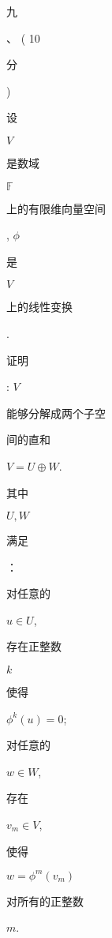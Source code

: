 \documentclass[10pt]{article}
\begin{document}
\begin{CJK}{UTF8}{mj}九\end{CJK}、 ( 10 \begin{CJK}{UTF8}{mj}分\end{CJK}) \begin{CJK}{UTF8}{mj}设\end{CJK} $V$ \begin{CJK}{UTF8}{mj}是数域\end{CJK} $\mathbb{F}$ \begin{CJK}{UTF8}{mj}上的有限维向量空间\end{CJK}, $\phi$ \begin{CJK}{UTF8}{mj}是\end{CJK} $V$ \begin{CJK}{UTF8}{mj}上的线性变换\end{CJK}. \begin{CJK}{UTF8}{mj}证明\end{CJK}: $V$ \begin{CJK}{UTF8}{mj}能够分解成两个子空\end{CJK} \begin{CJK}{UTF8}{mj}间的直和\end{CJK} $V=U \oplus W$. \begin{CJK}{UTF8}{mj}其中\end{CJK} $U, W$ \begin{CJK}{UTF8}{mj}满足\end{CJK}：\begin{CJK}{UTF8}{mj}对任意的\end{CJK} $u \in U$, \begin{CJK}{UTF8}{mj}存在正整数\end{CJK} $k$ \begin{CJK}{UTF8}{mj}使得\end{CJK} $\phi^{k}(u)=0$; \begin{CJK}{UTF8}{mj}对任意的\end{CJK} $w \in W$, \begin{CJK}{UTF8}{mj}存在\end{CJK} $v_{m} \in V$, \begin{CJK}{UTF8}{mj}使得\end{CJK} $w=\phi^{m}\left(v_{m}\right)$ \begin{CJK}{UTF8}{mj}对所有的正整数\end{CJK} $m$.
\end{document}
